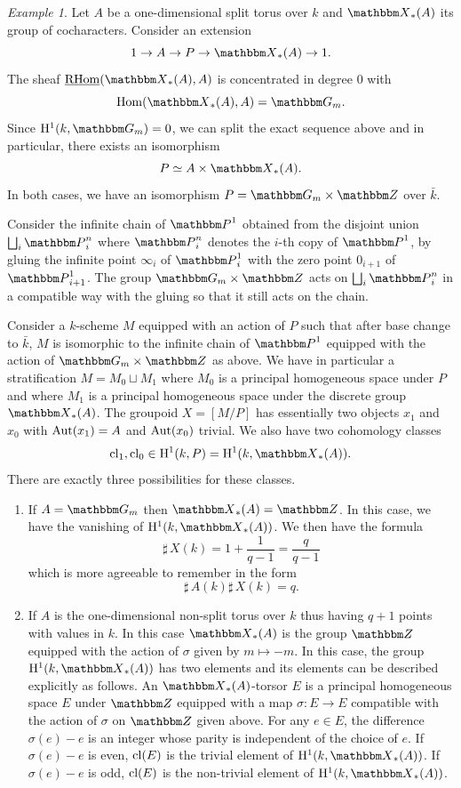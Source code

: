 \documentclass[12pt,english]{smfart}
\numberwithin{equation}{subsection}
\theoremstyle{remark}
\newtheorem{exemple}[equation]{Example}
\newcommand\GG{{\mathbbm G}}
\newcommand\ZZ{{\mathbbm Z}}
\newcommand\bbP{{\mathbbm P}}
\newcommand\rmH{{\rm H}}
\newcommand\bbX{{\mathbbm X}}
\newcommand\Hom{{\rm Hom}}
\newcommand\Aut{{\rm Aut}}
\newcommand\cl{{\rm cl}}
\newcommand\RHom{{\rm RHom}}
\begin{document}
\begin{exemple}\label{exemple : chaine infinie}
Let $A$ be a one-dimensional split torus over $k$ and $\bbX_*(A)$ its
group of cocharacters. Consider an extension
$$1\rightarrow A\rightarrow P \rightarrow \bbX_*(A) \rightarrow 1.$$
The sheaf $\underline \RHom(\bbX_*(A), A)$ is concentrated in degree $0$
with
$$\Hom(\bbX_*(A),A)=\GG_m.$$
Since $\rmH^1(k,\GG_m)=0$, we can split the exact sequence above and
in particular, there exists an isomorphism
$$P\simeq A\times \bbX_*(A).$$
In both cases, we have an isomorphism $P=\GG_m\times \ZZ$ over $\bar k$.

Consider the infinite chain of $\bbP^1$ obtained from the
disjoint union $\bigsqcup_i \bbP^n_i$ where $\bbP^n_i$ denotes the
$i$-th copy of $\bbP^1$, by gluing the infinite point $\infty_i$ of
$\bbP^1_i$ with the zero point $0_{i+1}$ of $\bbP^1_{i+1}$. The group
$\GG_m\times \ZZ$ acts on $\bigsqcup_i \bbP^n_i$ in a compatible way
with the gluing so that it still acts on the chain.

Consider a $k$-scheme $M$ equipped with an action of $P$ such that after
base change to $\bar k$, $M$ is isomorphic to the infinite chain of $\bbP^1$
equipped with the action of $\GG_m\times \ZZ$ as above. We have in particular
a stratification $M=M_0\sqcup M_1$ where $M_0$ is a principal homogeneous space under $P$
and where $M_1$ is a principal homogeneous space under the discrete group $\bbX_*(A)$. The
groupoid $X=[M/ P]$ has essentially two objects $x_1$ and $x_0$ with
$\Aut(x_1)=A$ and $\Aut(x_0)$ trivial. We also have two cohomology classes
$$\cl_1,\cl_0 \in \rmH^1(k,P)=\rmH^1(k,\bbX_*(A)).$$
There are exactly three possibilities for these classes.

\begin{enumerate}
 \item If $A=\GG_m$ then $\bbX_*(A)=\ZZ$. In this case, we have
   the vanishing of $\rmH^1(k,\bbX_*(A))$. We then have the formula
   $${\sharp\,} X(k)=1+\frac{1}{q-1}=\frac{q}{q-1}
   $$
   which is more agreeable to remember in the form
   $${\sharp\,} A(k) {\sharp\,} X(k)=q.$$
 \item If $A$ is the one-dimensional non-split torus over $k$ thus having
   $q+1$ points with values in $k$. In this case $\bbX_*(A)$ is the group $\ZZ$
   equipped with the action of $\sigma$ given by $m\mapsto -m$. In this
   case, the group $\rmH^1(k,\bbX_*(A))$ has two elements and its
   elements can be described explicitly as follows. An
   $\bbX_*(A)$-torsor $E$ is a principal homogeneous space $E$
   under $\ZZ$ equipped with a map $\sigma:E\rightarrow E$
   compatible with the action of $\sigma$ on $\ZZ$ given above.
   For any $e\in E$, the difference $\sigma(e)-e$ is an integer whose
   parity is independent of the choice of $e$. If $\sigma(e)-e$ is even,
   $\cl(E)$ is the trivial element of $\rmH^1(k,\bbX_*(A))$. If
   $\sigma(e)-e$ is odd, $\cl(E)$ is the non-trivial element of
   $\rmH^1(k,\bbX_*(A))$.


\end{enumerate}
\end{exemple}
\end{document}
